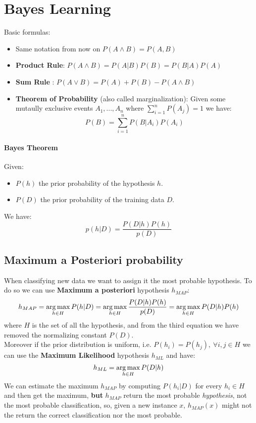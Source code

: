 


\section{Bayes Learning}

Basic formulas:
\begin{itemize}
\item Same notation from now on $P(A \wedge B)=P(A,B)$
\item \textbf{Product Rule}: $P(A \wedge B)=P(A|B)P(B)=P(B|A)P(A)$
\item \textbf{Sum Rule} : $P(A \vee B)= P(A)+P(B)-P(A \wedge B)$
\item \textbf{Theorem of Probability} (also called marginalization): Given some mutaully exclusive events $A_1,...,A_n$ where $\sum_{i=1}^n P(A_j)=1$ we have:
\[P(B) = \sum_{i=1}^n P(B|A_i)P(A_i)\]
\end{itemize}

\paragraph{Bayes Theorem}
Given:
\begin{itemize}
\item $P(h)$ the prior probability of the hypothesis $h$.
\item $P(D)$ the prior probability of the training data $D$.
\end{itemize}
We have:
\[p(h|D)=\frac{P(D|h)P(h)}{p(D)}\]

\subsection{Maximum a Posteriori probability}
When classifying new data we want to assign it the most probable hypothesis. To do so we can use \textbf{Maximum a posteriori} hypothesis $h_{MAP}$:
\[h_{MAP}=\operatorname*{arg\,max}_{h \in H}P(h|D)=\operatorname*{arg\,max}_{h \in H}\frac{P(D|h)P(h)}{p(D)}= \operatorname*{arg\,max}_{h \in H}P(D|h)P(h)\]
where $H$ is the set of all the hypothesis, and from the third equation we have removed the normalizing constant $P(D)$.\\
Moreover if the prior distribution is uniform, i.e. $P(h_i)=P(h_j),\ \forall i,j \in H$ we can use the \textbf{Maximum Likelihood} hypothesis $h_{ML}$ and have:
\[h_{ML}=\operatorname*{arg\,max}_{h \in H} P(D|h)\] 
We can estimate the maximum $h_{MAP}$ by computing $P(h_i|D)$ for every $h_i \in H$ and then get the maximum, \textbf{but} $h_{MAP}$ return the most probable \textit{hypothesis}, not the most probable classification, so, given a new instance $x$, $h_{MAP}(x)$ might not the return the correct classification nor the most probable.


